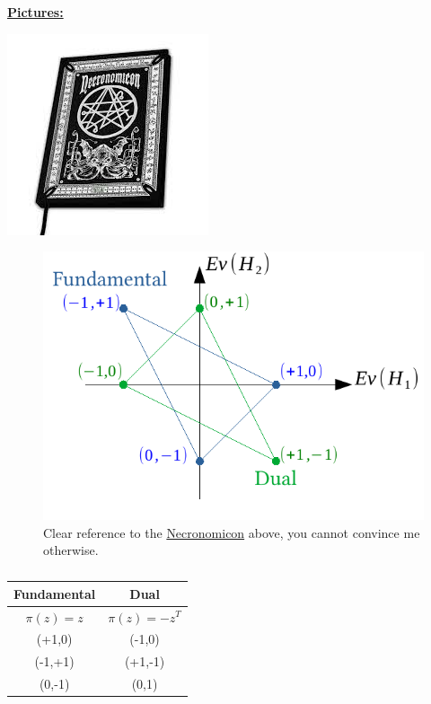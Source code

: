 \documentclass[../main.tex]{subfiles}
\begin{document}
\underline{\textbf{Pictures:}}\begin{marginfigure}
    \includegraphics{images/necronomiconvero.jpeg}
\end{marginfigure}
\begin{figure}[h!]
    \centering
    \includegraphics{images/necronomicon.pdf}
    \caption{Clear reference to the \href{https://it.wikipedia.org/wiki/Necronomicon}{Necronomicon} above, you cannot convince me otherwise.}
\end{figure}
\begin{table}[h!]
    \centering
    \begin{tabular}{c|c}
    \hline
    Fundamental & Dual \\
    \hline\hline
    $\pi(z)=z$ & $\pi(z)=-z^T$ \\
    (+1,0) & (-1,0) \\
    (-1,+1) & (+1,-1) \\
    (0,-1) & (0,1)
    \end{tabular}
    \caption*{}
    \label{tab:my_label}
\end{table}
\end{document}
